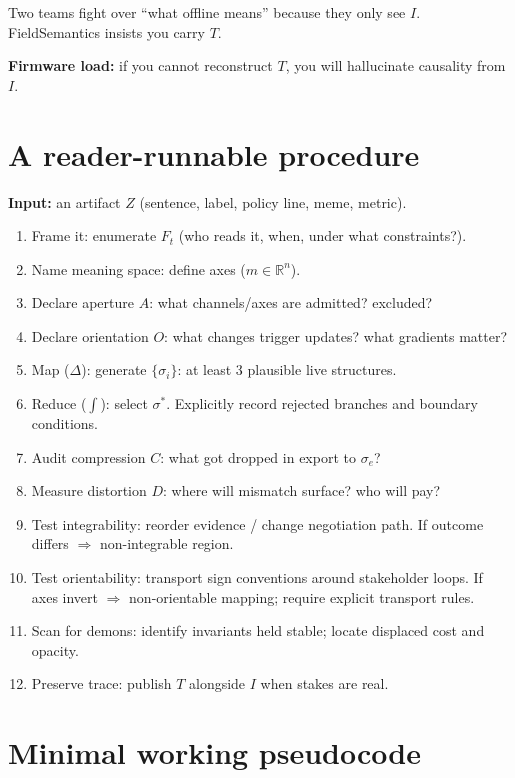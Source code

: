 \documentclass[11pt]{article}
\begin{document}
Two teams fight over ``what offline means'' because they only see $I$. FieldSemantics insists you carry $T$.

\textbf{Firmware load:} if you cannot reconstruct $T$, you will hallucinate causality from $I$.

\section{A reader-runnable procedure}

\textbf{Input:} an artifact $Z$ (sentence, label, policy line, meme, metric).

\begin{enumerate}[leftmargin=2em]
  \item Frame it: enumerate $F_t$ (who reads it, when, under what constraints?).
  \item Name meaning space: define axes ($m\in\mathbb{R}^n$).
  \item Declare aperture $A$: what channels/axes are admitted? excluded?
  \item Declare orientation $O$: what changes trigger updates? what gradients matter?
  \item Map ($\Delta$): generate $\{\sigma_i\}$: at least 3 plausible live structures.
  \item Reduce ($\int$): select $\sigma^*$. Explicitly record rejected branches and boundary conditions.
  \item Audit compression $C$: what got dropped in export to $\sigma_e$?
  \item Measure distortion $D$: where will mismatch surface? who will pay?
  \item Test integrability: reorder evidence / change negotiation path. If outcome differs $\Rightarrow$ non-integrable region.
  \item Test orientability: transport sign conventions around stakeholder loops. If axes invert $\Rightarrow$ non-orientable mapping; require explicit transport rules.
  \item Scan for demons: identify invariants held stable; locate displaced cost and opacity.
  \item Preserve trace: publish $T$ alongside $I$ when stakes are real.
\end{enumerate}

\section{Minimal working pseudocode}
\end{document}
